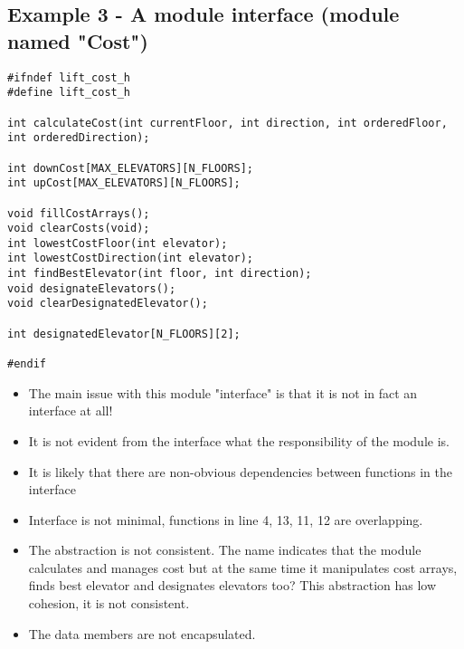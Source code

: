 \subsection{Example 3 - A module interface (module named "Cost")}
\begin{verbatim}
#ifndef lift_cost_h
#define lift_cost_h

int calculateCost(int currentFloor, int direction, int orderedFloor, int orderedDirection);

int downCost[MAX_ELEVATORS][N_FLOORS];
int upCost[MAX_ELEVATORS][N_FLOORS];

void fillCostArrays();
void clearCosts(void);
int lowestCostFloor(int elevator);
int lowestCostDirection(int elevator);
int findBestElevator(int floor, int direction);
void designateElevators();
void clearDesignatedElevator();

int designatedElevator[N_FLOORS][2];

#endif
\end{verbatim}
\begin{itemize}
\item The main issue with this module "interface" is that it is not in fact an interface at all!
\item It is not evident from the interface what the responsibility of the module is.
\item It is likely that there are non-obvious dependencies between functions in the interface
\item Interface is not minimal, functions in line 4, 13, 11, 12 are overlapping. 
\item The abstraction is not consistent. The name indicates that the module calculates and manages cost but at the same time it manipulates cost arrays, finds best elevator and designates elevators too? This abstraction has low cohesion, it is not consistent.
\item The data members are not encapsulated.
\end{itemize}
